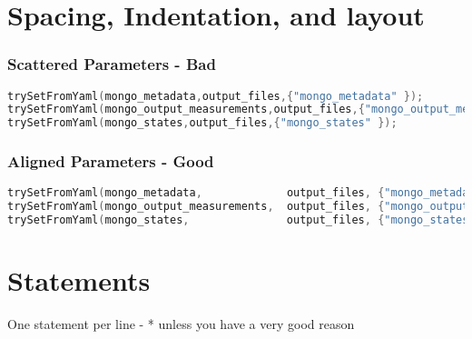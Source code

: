 \section{Spacing, Indentation, and layout}


\subsubsection{Scattered Parameters - Bad}

\begin{lstlisting}[language=c++]
trySetFromYaml(mongo_metadata,output_files,{"mongo_metadata" });
trySetFromYaml(mongo_output_measurements,output_files,{"mongo_output_measurements" });
trySetFromYaml(mongo_states,output_files,{"mongo_states" });
\end{lstlisting}

\subsubsection{Aligned Parameters - Good}
\begin{lstlisting}[language=c++]
trySetFromYaml(mongo_metadata,             output_files, {"mongo_metadata"              });
trySetFromYaml(mongo_output_measurements,  output_files, {"mongo_output_measurements"	});
trySetFromYaml(mongo_states,               output_files, {"mongo_states"		        });
\end{lstlisting}

\section{Statements}

One statement per line 
- * unless you have a very good reason

